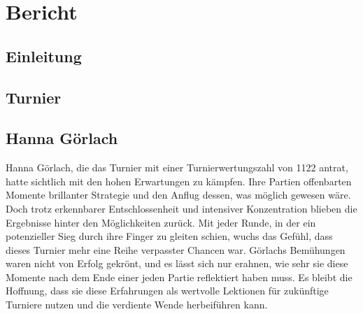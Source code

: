 \documentclass[a4paper,ngerman]{tui-algo-seminar}
\title{\inhalt}
\author{Erik Skopp}
\newcommand{\inhalt}{Thüringer Jugend Einzelmeisterschaft 2024}
\begin{document}
\maketitle
\thispagestyle{plain}
\begin{abstract}
    Bericht: \inhalt.\\
    Vom 4. bis zum 7. April fand in Naumburg (Sachsen-Anhalt) die diesjährige Thüringer Jugend-Einzelmeisterschaft im Schach statt. In jeder Altersklasse wurden sieben Runden nach dem Schweizer System ausgetragen. Die Gewinner qualifizieren sich für die Deutsche Einzelmeisterschaft in Willingen.
\end{abstract}

\tableofcontents 

\clearpage

\section{Bericht}


\subsection{Einleitung}

\subsection{Turnier}

\subsection{Hanna Görlach}
Hanna Görlach, die das Turnier mit einer Turnierwertungszahl von 1122 antrat, hatte sichtlich mit den hohen Erwartungen zu kämpfen. Ihre Partien offenbarten Momente brillanter Strategie und den Anflug dessen, was möglich gewesen wäre. Doch trotz erkennbarer Entschlossenheit und intensiver Konzentration blieben die Ergebnisse hinter den Möglichkeiten zurück. Mit jeder Runde, in der ein potenzieller Sieg durch ihre Finger zu gleiten schien, wuchs das Gefühl, dass dieses Turnier mehr eine Reihe verpasster Chancen war. Görlachs Bemühungen waren nicht von Erfolg gekrönt, und es lässt sich nur erahnen, wie sehr sie diese Momente nach dem Ende einer jeden Partie reflektiert haben muss. Es bleibt die Hoffnung, dass sie diese Erfahrungen als wertvolle Lektionen für zukünftige Turniere nutzen und die verdiente Wende herbeiführen kann.
\end{document}

